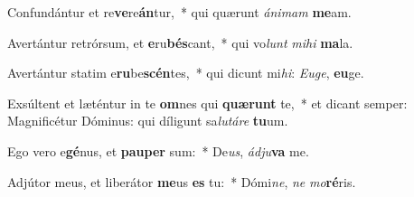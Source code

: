 \item Confundántur et re\textbf{ve}re\textbf{án}tur,~* qui quærunt \textit{á}\textit{ni}\textit{mam} \textbf{me}am.
\item Avertántur retrórsum, et \textbf{e}ru\textbf{bés}cant,~* qui vo\textit{lunt} \textit{mi}\textit{hi} \textbf{ma}la.
\item Avertántur statim e\textbf{ru}be\textbf{scén}tes,~* qui dicunt mi\textit{hi}: \textit{Eu}\textit{ge}, \textbf{eu}ge.
\item Exsúltent et læténtur in te \textbf{om}nes qui \textbf{quæ}\textbf{runt} te,~* et dicant semper: Magnificétur Dóminus: qui díligunt sa\textit{lu}\textit{tá}\textit{re} \textbf{tu}um.
\item Ego vero e\textbf{gé}nus, et \textbf{pau}\textbf{per} sum:~* De\textit{us}, \textit{ád}\textit{ju}\textbf{va} me.
\item Adjútor meus, et liberátor \textbf{me}us \textbf{es} tu:~* Dómi\textit{ne}, \textit{ne} \textit{mo}\textbf{ré}ris.
